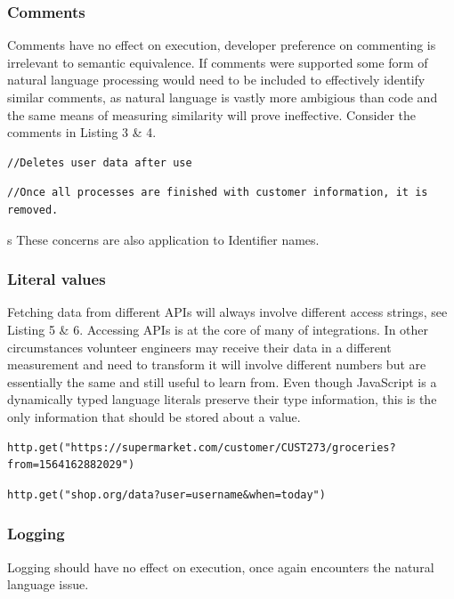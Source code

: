 \documentclass[jou,apacite]{apa6}
\begin{document}
\subsubsection{Comments}
 Comments have no effect on execution, developer preference on commenting is irrelevant to semantic equivalence. If comments were supported some form of natural language processing would need to be included to effectively identify similar comments, as natural language is vastly more ambigious than code and the same means of measuring similarity will prove ineffective. Consider the comments in Listing 3 \& 4.
 
\begin{lstlisting}[caption=Comment semantics - A]
//Deletes user data after use
\end{lstlisting} 

\begin{lstlisting}[caption=Comment semantics- B]
//Once all processes are finished with customer information, it is removed.
\end{lstlisting} 
s
These concerns are also application to Identifier names.
 
\subsubsection{Literal values}
Fetching data from different APIs will always involve different access strings, see Listing 5 \& 6. Accessing APIs is at the core of many of integrations. In other circumstances volunteer engineers may receive their data in a different measurement and need to transform it will involve different numbers but are essentially the same and still useful to learn from. Even though JavaScript is a dynamically typed language literals preserve their type information, this is the only information that should be stored about a value.

\begin{lstlisting}[caption=API access string dissimilarity - A]
http.get("https://supermarket.com/customer/CUST273/groceries?from=1564162882029")
\end{lstlisting} 

\begin{lstlisting}[caption=API access string dissimilarity - B]
http.get("shop.org/data?user=username&when=today")
\end{lstlisting} 
\subsubsection{Logging}
Logging should have no effect on execution, once again encounters the natural language issue.
\newline
\end{document}

